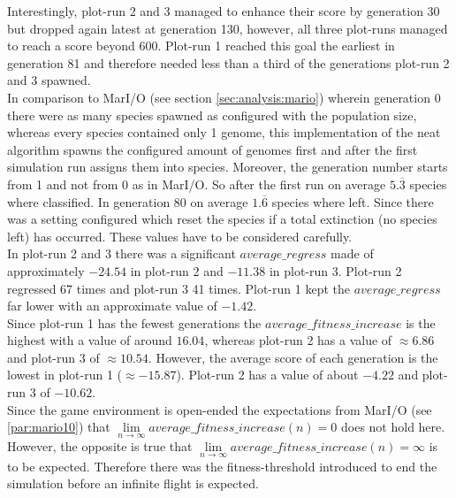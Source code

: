 			Interestingly, plot-run 2 and 3 managed to enhance their score by generation 30 but dropped again latest at generation 130, however, all three plot-runs managed to reach a score beyond 600. Plot-run 1 reached this goal the earliest in generation 81 and therefore needed less than a third of the generations plot-run 2 and 3 spawned.\\
			In comparison to MarI/O (see section \ref{sec:analysis:mario}) wherein generation 0 there were as many species spawned as configured with the population size, whereas every species contained only 1 genome, this implementation of the \gls{neat} algorithm spawns the configured amount of genomes first and after the first simulation run assigns them into species. Moreover, the generation number starts from 1 and not from 0 as in MarI/O. So after the first run on average $5.\overline{3}$ species where classified. In generation 80 on average $1.\overline{6}$ species where left. Since there was a setting configured which reset the species if a total extinction (no species left) has occurred. These values have to be considered carefully.\\
			In plot-run 2 and 3 there was a significant $average\_regress$ made of approximately $-24.54$ in plot-run 2 and $-11.38$ in plot-run 3. Plot-run 2 regressed 67 times and plot-run 3 41 times. Plot-run 1 kept the $average\_regress$ far lower with an approximate value of $-1.42$.\\
			Since plot-run 1 has the fewest generations the $average\_fitness\_increase$ is the highest with a value of around $16.04$, whereas plot-run 2 has a value of $\approx6.86$ and plot-run 3 of $\approx10.54$. However, the average score of each generation is the lowest in plot-run 1 ($\approx-15.87$). Plot-run 2 has a value of about $-4.22$ and plot-run 3 of $-10.62$. \\
			Since the game environment is open-ended the expectations from MarI/O (see \ref{par:mario10}) that $\lim\limits_{n \to \infty} average\_fitness\_increase(n) = 0$ does not hold here. However, the opposite is true that $\lim\limits_{n \to \infty} average\_fitness\_increase(n) = \infty$ is to be expected. Therefore there was the fitness-threshold introduced to end the simulation before an infinite flight is expected.
		
